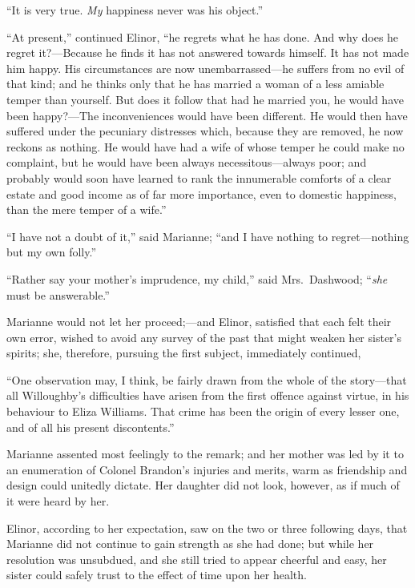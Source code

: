 ``It is very true.  \emph{My} happiness never was his object.''

``At present,'' continued Elinor, ``he regrets what he
has done.  And why does he regret it?---Because he finds
it has not answered towards himself.  It has not made
him happy.  His circumstances are now unembarrassed---he
suffers from no evil of that kind; and he thinks only
that he has married a woman of a less amiable temper
than yourself.  But does it follow that had he married you,
he would have been happy?---The inconveniences would have
been different.  He would then have suffered under the
pecuniary distresses which, because they are removed,
he now reckons as nothing.  He would have had a wife
of whose temper he could make no complaint, but he would
have been always necessitous---always poor; and probably
would soon have learned to rank the innumerable comforts
of a clear estate and good income as of far more importance,
even to domestic happiness, than the mere temper of a wife.''

``I have not a doubt of it,'' said Marianne; ``and I
have nothing to regret---nothing but my own folly.''

``Rather say your mother's imprudence, my child,''
said Mrs.\ Dashwood; ``\emph{she} must be answerable.''

Marianne would not let her proceed;---and Elinor,
satisfied that each felt their own error, wished to avoid
any survey of the past that might weaken her sister's
spirits; she, therefore, pursuing the first subject,
immediately continued,

``One observation may, I think, be fairly drawn from
the whole of the story---that all Willoughby's difficulties
have arisen from the first offence against virtue, in his
behaviour to Eliza Williams.  That crime has been the origin
of every lesser one, and of all his present discontents.''

Marianne assented most feelingly to the remark;
and her mother was led by it to an enumeration of Colonel
Brandon's injuries and merits, warm as friendship
and design could unitedly dictate.  Her daughter did
not look, however, as if much of it were heard by her.

Elinor, according to her expectation, saw on the two
or three following days, that Marianne did not continue
to gain strength as she had done; but while her resolution
was unsubdued, and she still tried to appear cheerful
and easy, her sister could safely trust to the effect
of time upon her health.

